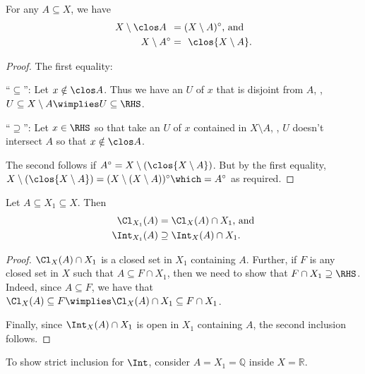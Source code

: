 	\begin{lem}\label{LEM: complements of clos and int}
		For any $A\subseteq X$, we have
		\begin{align*}
			X\setminus\clos A\phantom{^\circ} & = (X\setminus A)^\circ\text{, and}\\
			X\setminus A^\circ & = \phantom{(}\clos{X\setminus A}\text.
		\end{align*}
	\end{lem}
	
	\begin{proof}
		The first equality:
		\begin{subproof}
			``$\subseteq$'': Let $x\notin \clos A$. Thus we have an \onbd $U$ of $x$ that is disjoint from $A$, \ie, $U\subseteq X\setminus A\wimplies U\subseteq \RHS$.
		
			\noindent``$\supseteq$'': Let $x\in\RHS$ so that take an \onbd $U$ of $x$ contained in $X\setminus A$, \ie, $U$ doesn't intersect $A$ so that $x\notin \clos A$.\qedhere
		\end{subproof}
		
		The second follows if $A^\circ = X\setminus(\clos{X\setminus A})$. But by the first equality, $X\setminus(\clos{X\setminus A}) = (X\setminus(X\setminus A))^\circ\which = A^\circ$ as required.
	\end{proof}
	
	
	\begin{lem}\label{LEM: clos in subspaces}
		Let $A\subseteq X_1\subseteq X$. Then
		\begin{align*}
			\Cl_{X_1}(A) & = \Cl_X(A)\cap X_1\text{, and}\\
			\Int_{X_1}(A) & \supseteq \Int_X(A)\cap X_1\text.
		\end{align*}
	\end{lem}
	
	\begin{proof}
		$\Cl_X(A)\cap X_1$ is a closed set in $X_1$ containing $A$. Further, if $F$ is any closed set in $X$ such that $A\subseteq F\cap X_1$, then we need to show that $F\cap X_1\supseteq \RHS$. Indeed, since $A\subseteq F$, we have that $\Cl_X(A)\subseteq F\wimplies\Cl_X(A)\cap X_1\subseteq F\cap X_1$.
		
		Finally, since $\Int_X(A)\cap X_1$ is open in $X_1$ containing $A$, the second inclusion follows.
	\end{proof}
	
	\begin{rmk}
		To show strict inclusion for $\Int$, consider $A = X_1 = \mathbb Q$ inside $X = \mathbb R$.
	\end{rmk}
	

